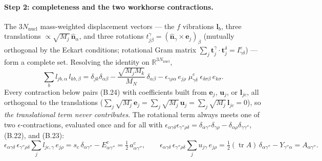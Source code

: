 \paragraph{Step 2: completeness and the two workhorse contractions.}
The $3N_{\mathrm{nucl}}$ mass-weighted displacement vectors --- the $f$ vibrations $\mathbf l_{b}$, three translations $\propto\sqrt{M_j}\,\hat{\mathbf n}_\alpha$, and three rotations $t^{\gamma}_{j\beta}=(\hat{\mathbf n}_\gamma\times\mathbf e_j)_\beta$ (mutually orthogonal by the Eckart conditions; rotational Gram matrix $\sum_j\mathbf t^{\gamma}_j\!\cdot\!\mathbf t^{\delta}_j=I^{e}_{\gamma\delta}$) --- form a complete set. Resolving the identity on $\mathbb R^{3N_{\mathrm{nucl}}}$,
\begin{equation}
\sum_b l_{jb,\alpha}\,l_{kb,\beta}
=\delta_{jk}\delta_{\alpha\beta}
-\frac{\sqrt{M_jM_k}}{M_N}\,\delta_{\alpha\beta}
-\epsilon_{\gamma\rho\alpha}\,e_{j\rho}\;\mu^{e}_{\gamma\delta}\;\epsilon_{\delta\sigma\beta}\,e_{k\sigma}. \tag{B.24}
\end{equation}
Every contraction below pairs (B.24) with coefficients built from $\mathbf e_j$, $\mathbf u_j$, or $\mathbf l_{jc}$, all orthogonal to the translations ($\sum_j\sqrt{M_j}\,\mathbf e_j=\sum_j\sqrt{M_j}\,\mathbf u_j=\sum_j\sqrt{M_j}\,\mathbf l_{jc}=0$), so \emph{the translational term never contributes}. The rotational term always meets one of two $\epsilon$-contractions, evaluated once and for all with $\epsilon_{\alpha\gamma\delta}\epsilon_{\gamma''\rho\delta}=\delta_{\alpha\gamma''}\delta_{\gamma\rho}-\delta_{\alpha\rho}\delta_{\gamma\gamma''}$, (B.22), and (B.23):
\begin{equation}
\epsilon_{\alpha\gamma\delta}\,\epsilon_{\gamma''\rho\delta}\sum_j l_{jc,\gamma}\,e_{j\rho}
=s_c\,\delta_{\alpha\gamma''}-E^{c}_{\alpha\gamma''}=\tfrac12\,a^{c}_{\alpha\gamma''},
\qquad
\epsilon_{\alpha\gamma\delta}\,\epsilon_{\gamma''\rho\delta}\sum_j u_{j\gamma}\,e_{j\rho}
=\tfrac12(\operatorname{tr}A)\,\delta_{\alpha\gamma''}-Y_{\gamma''\alpha}=A_{\alpha\gamma''}. \tag{B.25}
\end{equation}

